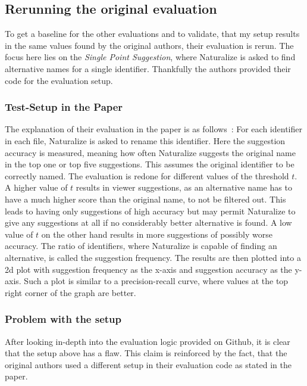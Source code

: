 \subsection{Rerunning the original evaluation}
To get a baseline for the other evaluations and to validate, that my setup results in the same values found
by the original authors, their evaluation is rerun. The focus here lies on the \emph{Single Point Suggestion},
where Naturalize is asked to find alternative names for a single identifier. Thankfully the authors provided
their code for the evaluation setup.

\subsubsection{Test-Setup in the Paper}
The explanation of their evaluation in the paper is as follows~\cite{naturalize}:
For each identifier in each file, Naturalize is asked to rename this identifier.
Here the suggestion accuracy is measured, meaning how often Naturalize suggests the original name in the top one
or top five suggestions. This assumes the original identifier to be correctly named.
The evaluation is redone for different values of the threshold $t$. A higher value of $t$ results in viewer
suggestions, as an alternative name has to have a much higher score than the original name, to not be
filtered out. This leads to having only suggestions of high accuracy but may permit Naturalize to give
any suggestions at all if no considerably better alternative is found. A low value of $t$ on the other hand results in
more suggestions of possibly worse accuracy.
The ratio of identifiers, where Naturalize is capable of finding an alternative, is called the suggestion frequency.
The results are then plotted into a 2d plot with suggestion frequency as the x-axis and suggestion accuracy as the y-axis. Such a plot is similar to a precision-recall curve, where values at the top right corner of the graph are better.

\subsubsection{Problem with the setup}
After looking in-depth into the evaluation logic provided on Github, it is clear that the setup above has a flaw. This claim is reinforced by the fact,
that the original authors used a different setup in their evaluation code as stated in
the paper. 

